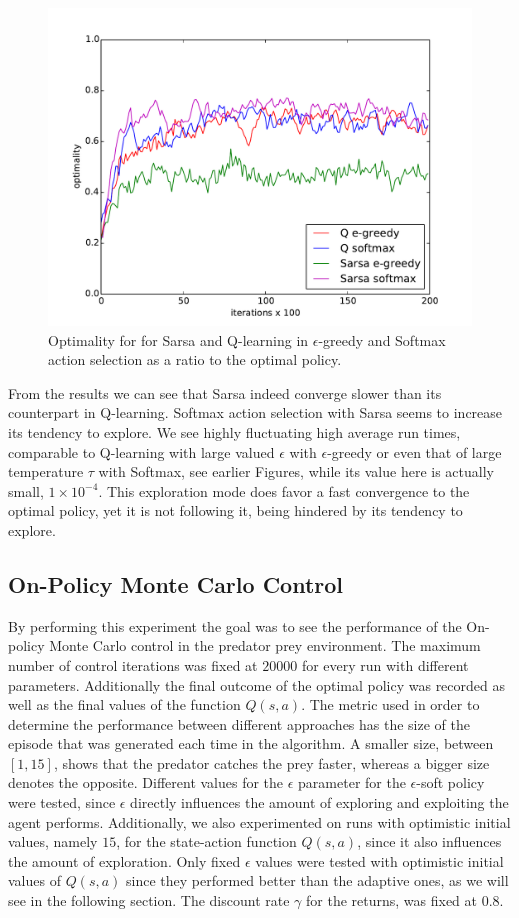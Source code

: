 \documentclass[paper=a4, fontsize=11pt]{scrartcl}
\numberwithin{equation}{section}		%
\numberwithin{figure}{section}			%
\numberwithin{table}{section}				%
\begin{document}
\begin{figure}[H] \centering
\includegraphics[scale=0.6]{sarsaOptimality.pdf}
\caption{Optimality for for Sarsa and Q-learning in $\epsilon$-greedy and Softmax action selection as a ratio to the optimal policy.} 
\label{figure:sarsaOpti}
\end{figure}
From the results we can see that Sarsa indeed converge slower than its counterpart in Q-learning. Softmax action selection with Sarsa seems to increase its  tendency to explore. We see highly fluctuating high average run times, comparable to Q-learning with large valued $\epsilon$ with $\epsilon$-greedy or even that of large temperature $\tau$ with Softmax, see earlier Figures, while its value here is actually small, $1 \times 10^{-4}$. This exploration mode does favor a fast  convergence to the optimal policy, yet it is not following it, being hindered by its tendency to explore.

\subsection{On-Policy Monte Carlo Control}
By performing this experiment the goal was to see the performance of the On-policy Monte Carlo control in the predator prey environment. The maximum number of control iterations was fixed at $20000$ for every run with different parameters. Additionally the final outcome of the optimal policy was recorded as well as the final values of the function $Q(s,a)$. The metric used in order to determine the performance between different approaches has the size of the episode that was generated each time in the algorithm. A smaller size, between $[1,15]$, shows that the predator catches the prey faster, whereas a bigger size denotes the opposite. Different values for the $\epsilon$ parameter for the $\epsilon$-soft policy were tested, since $\epsilon$ directly influences the amount of exploring and exploiting the agent performs. Additionally, we also experimented on runs with optimistic initial values, namely $15$, for the state-action function $Q(s,a)$, since it also influences the amount of exploration. Only fixed $\epsilon$ values were tested with optimistic initial values of $Q(s,a)$ since they performed better than the adaptive ones, as we will see in the following section. The discount rate $\gamma$ for the returns, was fixed at 0.8.
\end{document}
